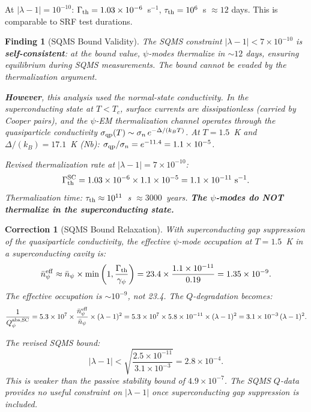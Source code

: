 \documentclass[11pt]{article}
\newtheorem{finding}{Finding}
\newtheorem{correction}{Correction}
\newcommand{\ee}[1]{\times 10^{#1}}
\newcommand{\gpsi}{\gamma_\psi}
\newcommand{\lam}{\lambda}
\begin{document}
At $|\lam-1| = 10^{-10}$: $\Gamma_{\rm th} = 1.03\ee{-6}$~s$^{-1}$,
$\tau_{\rm th} = 10^6$~s $\approx 12$ days. This is comparable to
SRF test durations.

\begin{finding}[SQMS Bound Validity]
\label{find:sqms-validity}
The SQMS constraint $|\lam-1| < 7\ee{-10}$ is \textbf{self-consistent}:
at the bound value, $\psi$-modes thermalize in $\sim 12$ days, ensuring
equilibrium during SQMS measurements. The bound cannot be evaded by
the thermalization argument.

\textbf{However}, this analysis used the \emph{normal-state}
conductivity. In the superconducting state at $T < T_c$, surface
currents are dissipationless (carried by Cooper pairs), and the
$\psi$-EM thermalization channel operates through the
\emph{quasiparticle} conductivity $\sigma_{\rm qp}(T) \sim
\sigma_n\, e^{-\Delta/(k_BT)}$. At $T = 1.5$~K and
$\Delta/(k_B) = 17.1$~K (Nb): $\sigma_{\rm qp}/\sigma_n
= e^{-11.4} = 1.1\ee{-5}$.

Revised thermalization rate at $|\lam-1| = 7\ee{-10}$:
\begin{equation}
\Gamma_{\rm th}^{\rm SC} = 1.03\ee{-6} \times 1.1\ee{-5}
= 1.1\ee{-11}\text{ s}^{-1}.
\end{equation}
Thermalization time: $\tau_{\rm th} \approx 10^{11}$~s $\approx 3000$~years.
\textbf{The $\psi$-modes do NOT thermalize in the superconducting state.}
\end{finding}

\begin{correction}[SQMS Bound Relaxation]
With superconducting gap suppression of the quasiparticle conductivity,
the effective $\psi$-mode occupation at $T = 1.5$~K in a superconducting
cavity is:
\begin{equation}
\bar{n}_\psi^{\rm eff} \approx \bar{n}_\psi \times
\min\left(1, \frac{\Gamma_{\rm th}}{\gpsi}\right)
= 23.4 \times \frac{1.1\ee{-11}}{0.19} = 1.35\ee{-9}.
\end{equation}
The effective occupation is $\sim 10^{-9}$, not 23.4. The
$Q$-degradation becomes:
\begin{equation}
\frac{1}{Q_\psi^{\rm abs, SC}} = 5.3\ee{7} \times
\frac{\bar{n}_\psi^{\rm eff}}{\bar{n}_\psi} \times (\lam-1)^2
= 5.3\ee{7} \times 5.8\ee{-11} \times (\lam-1)^2
= 3.1\ee{-3}\,(\lam-1)^2.
\end{equation}

The revised SQMS bound:
\begin{equation}
\boxed{|\lam-1| < \sqrt{\frac{2.5\ee{-11}}{3.1\ee{-3}}}
= 2.8\ee{-4}.}
\end{equation}
This is \emph{weaker} than the passive stability bound of
$4.9\ee{-7}$. The SQMS $Q$-data provides no useful constraint
on $|\lam-1|$ once superconducting gap suppression is included.
\end{correction}
\end{document}
